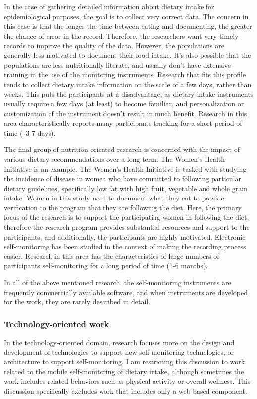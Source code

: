In the case of gathering detailed information about dietary intake for epidemiological purposes, the goal is to collect very correct data. The concern in this case is that the longer the time between eating and documenting, the greater the chance of error in the record. Therefore, the researchers want very timely records to improve the quality of the data. However, the populations are generally less motivated to document their food intake. It's also possible that the populations are less nutritionally literate, and usually don't have extensive training in the use of the monitoring instruments. Research that fits this profile tends to collect dietary intake information on the scale of a few days, rather than weeks. This puts the participants at a disadvantage, as dietary intake instruments usually require a few days (at least) to become familiar, and personalization or customization of the instrument doesn't result in much benefit. Research in this area characteristically reports many participants tracking for a short period of time (~3-7 days).

The final group of nutrition oriented research is concerned with the impact of various dietary recommendations over a long term. The Women's Health Initiative is an example. The Women's Health Initiative is tasked with studying the incidence of disease in women who have committed to following particular dietary guidelines, specifically low fat with high fruit, vegetable and whole grain intake. Women in this study need to document what they eat to provide verification to the program that they are following the diet. Here, the primary focus of the research is to support the participating women in following the diet, therefore the research program provides substantial resources and support to the participants, and additionally, the participants are highly motivated. Electronic self-monitoring has been studied in the context of making the recording process easier. Research in this area has the characteristics of large numbers of participants self-monitoring for a long period of time (1-6 months). 

In all of the above mentioned research, the self-monitoring instruments are frequently commercially available software, and when instruments are developed for the work, they are rarely described in detail. 

\subsubsection{Technology-oriented work}
In the technology-oriented domain, research focuses more on the design and development of technologies to support new self-monitoring technologies, or architecture to support self-monitoring. I am restricting this discussion to  work related to the mobile self-monitoring of dietary intake, although sometimes the work includes related behaviors such as physical activity or overall wellness. This discussion specifically excludes work that includes only a web-based component. 

